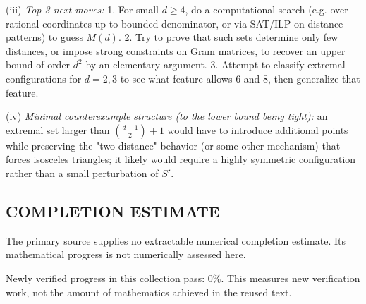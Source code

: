 (iii) \emph{Top 3 next moves:}
1. For small $d\ge 4$, do a computational search (e.g. over rational coordinates up to bounded denominator, or via SAT/ILP on distance patterns) to guess $M(d)$.
2. Try to prove that such sets determine only few distances, or impose strong constraints on Gram matrices, to recover an upper bound of order $d^2$ by an elementary argument.
3. Attempt to classify extremal configurations for $d=2,3$ to see what feature allows $6$ and $8$, then generalize that feature.

(iv) \emph{Minimal counterexample structure (to the lower bound being tight):} an extremal set larger than $\binom{d+1}{2}+1$ would have to introduce additional points while preserving the "two-distance" behavior (or some other mechanism) that forces isosceles triangles; it likely would require a highly symmetric configuration rather than a small perturbation of $S'$.




\subsection*{COMPLETION ESTIMATE}
The primary source supplies no extractable numerical completion estimate. Its mathematical progress is not numerically assessed here.

Newly verified progress in this collection pass: $0\%$. This measures new verification work, not the amount of mathematics achieved in the reused text.
